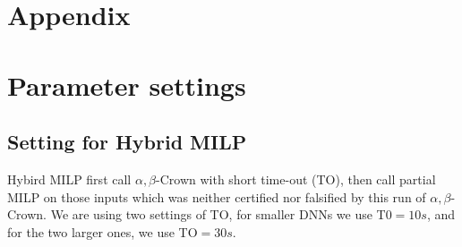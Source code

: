 \vspace{-0.6cm}

\section*{Appendix}

\section{Parameter settings}

%
%
%
%
%

\subsection*{Setting for Hybrid MILP}


Hybird MILP first call $\alpha,\beta$-Crown with short time-out (TO), then call partial MILP on those inputs which was neither certified nor falsified by this run of $\alpha,\beta$-Crown. We are using two settings of TO, for smaller DNNs we use T0$=10s$, and for the two larger ones, we use TO$=30s$.

